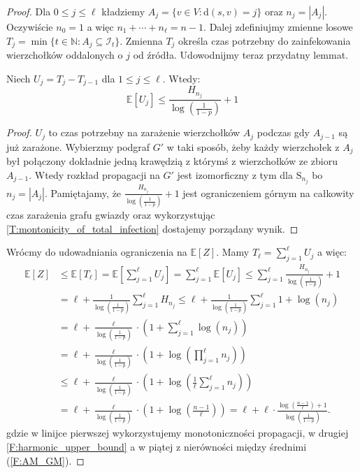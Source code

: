 \begin{proof}
Dla $0\le j \le \ell$ kładziemy $A_j = \{v \in V : \mathrm{d}(s,v) = j\}$ oraz $n_j= |A_j|$. Oczywiście $n_0=1$ a więc $n_1+\cdots+ n_\ell = n -1 $. Dalej zdefiniujmy zmienne losowe $T_j = \min\{t\in\mathbb{N} : A_j \subseteq \mathcal{I}_t\}$. Zmienna $T_j$ określa czas potrzebny do zainfekowania wierzchołków oddalonych o $j$ od źródła. Udowodnijmy teraz przydatny lemmat.

\begin{lemma}\label{L:helper_lemma}
Niech $U_j = T_j - T_{j-1}$ dla $1 \le j \le \ell$. Wtedy:
\[
    \mathbb{E}[U_j] \le \frac{H_{n_j}}{\log(\frac{1}{1-p})} + 1
\]
\end{lemma}
\begin{proof}
$U_j$ to czas potrzebny na zarażenie wierzchołków $A_j$ podczas gdy $A_{j-1}$ są już zarażone. Wybierzmy podgraf $G'$ w taki sposób, żeby każdy wierzchołek z $A_j$ był połączony dokładnie jedną krawędzią z którymś z wierzchołków ze zbioru $A_{j-1}$. Wtedy rozkład propagacji na $G'$ jest izomorficzny z tym dla $\mathrm{S}_{n_j}$ bo $n_j=|A_j|$. Pamiętajamy, że $\frac{H_{n_j}}{\log(\frac{1}{1-p})} + 1$ jest ograniczeniem górnym na całkowity czas zarażenia grafu gwiazdy oraz wykorzystując \cref{T:montonicity_of_total_infection} dostajemy porządany wynik.
\end{proof}

Wrócmy do udowadniania ograniczenia na $\mathbb{E}[Z]$. Mamy $T_\ell = \sum_{j=1}^{\ell} U_j$ a więc:
\begin{equation*}
\begin{aligned}
\mathbb{E}[Z] 
&\le \mathbb{E}[T_\ell] 
  = \mathbb{E}\left[\sum_{j=1}^{\ell} U_j\right] 
  = \sum_{j=1}^{\ell} \mathbb{E}[U_j] 
  \le \sum_{j=1}^{\ell} \frac{H_{n_j}}{\log(\frac{1}{1-p})} + 1 \\
&= \ell + \frac{1}{\log(\frac{1}{1-p})} \sum_{j=1}^{\ell} H_{n_j} 
  \le \ell + \frac{1}{\log(\frac{1}{1-p})} \sum_{j=1}^{\ell} 1 + \log(n_j) \\
&= \ell + \frac{\ell}{\log(\frac{1}{1-p})} \cdot \left(1 + \sum_{j=1}^{\ell} \log(n_j) \right) \\
&= \ell + \frac{\ell}{\log(\frac{1}{1-p})} \cdot \left(1 + \log \left(\prod_{j=1}^{\ell} n_j\right)\right) \\
&\le \ell + \frac{\ell}{\log(\frac{1}{1-p})} \cdot \left(1 + \log \left(\frac{1}{\ell} \sum_{j=1}^{\ell} n_j\right) \right) \\
&= \ell + \frac{\ell}{\log(\frac{1}{1-p})} \cdot \left(1 + \log \left(\frac{n-1}{\ell}\right) \right) = \ell  + \ell \cdot \frac{\log(\frac{n-1}{\ell}) + 1}{\log(\frac{1}{1-p})}.
\end{aligned}
\end{equation*}
gdzie w linijce pierwszej wykorzystujemy monotoniczności propagacji, w drugiej \cref{F:harmonic_upper_bound} a w piątej z nierówności między średnimi (\ref{F:AM_GM}).
\end{proof}

